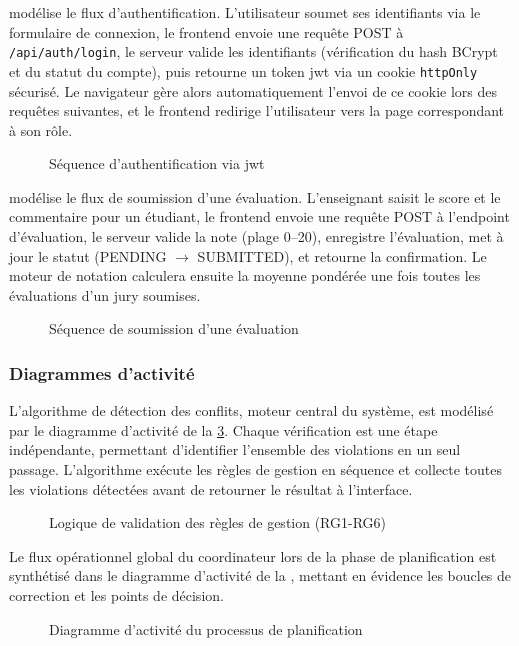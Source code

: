  modélise le flux d'authentification. L'utilisateur soumet ses identifiants via le formulaire de connexion, le frontend envoie une requête POST à \texttt{/api/auth/login}, le serveur valide les identifiants (vérification du hash BCrypt et du statut du compte), puis retourne un token \acrshort{jwt} via un cookie \texttt{httpOnly} sécurisé. Le navigateur gère alors automatiquement l'envoi de ce cookie lors des requêtes suivantes, et le frontend redirige l'utilisateur vers la page correspondant à son rôle.

\begin{figure}[H]
    \centering
    \caption{Séquence d'authentification via \acrshort{jwt}}
    \label{fig:seq_auth}
\end{figure}

 modélise le flux de soumission d'une évaluation. L'enseignant saisit le score et le commentaire pour un étudiant, le frontend envoie une requête POST à l'endpoint d'évaluation, le serveur valide la note (plage 0--20), enregistre l'évaluation, met à jour le statut (PENDING $\rightarrow$ SUBMITTED), et retourne la confirmation. Le moteur de notation calculera ensuite la moyenne pondérée une fois toutes les évaluations d'un jury soumises.

\begin{figure}[H]
    \centering
    \caption{Séquence de soumission d'une évaluation}
    \label{fig:seq_evaluation}
\end{figure}

\subsubsection{Diagrammes d'activité}
\label{ch3:activite}

L'algorithme de détection des conflits, moteur central du système, est modélisé par le diagramme d'activité de la \cref{fig:act_conflict}. Chaque vérification est une étape indépendante, permettant d'identifier l'ensemble des violations en un seul passage. L'algorithme exécute les  règles de gestion en séquence et collecte toutes les violations détectées avant de retourner le résultat à l'interface.

\begin{figure}[H]
    \centering
    \caption{Logique de validation des  règles de gestion (RG1-RG6)}
    \label{fig:act_conflict}
\end{figure}
Le flux opérationnel global du coordinateur lors de la phase de planification est synthétisé dans le diagramme d'activité de la , mettant en évidence les boucles de correction et les points de décision.
\begin{figure}[H]
    \centering
    \caption{Diagramme d'activité du processus de planification}
    \label{fig:act_planning}
\end{figure}

